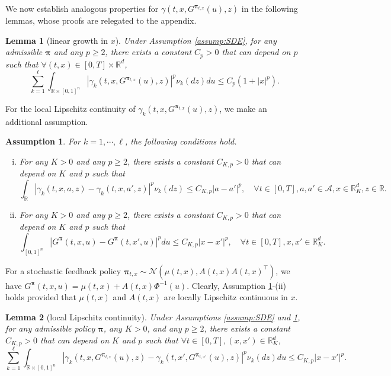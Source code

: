 \documentclass[11pt]{article}
\newtheorem{lemma}{Lemma}
\newtheorem{assumption}{Assumption}
\newcommand{\1}{\mathbbm{1}}
\newcommand{\bpi}{\boldsymbol{\pi}}
\begin{document}
We now establish analogous  properties for $\gamma(t,x,G^{\bpi_{t,x}}(u),z)$ in the following lemmas, whose proofs are relegated to the appendix.

\begin{lemma}[linear growth in $x$]\label{lem:expl-jump-LG}
Under Assumption \ref{assump:SDE}, for any admissible $\bpi$ and any $p\geq 2$, there exists a constant $C_p>0$ that can depend on $p$ such that $\forall(t, x) \in[0, T] \times \mathbb{R}^d$,
\begin{equation}
	\sum_{k=1}^\ell \int_{\mathbb{R}\times[0,1]^n}\left|\gamma_k\left(t,x,G^{\bpi_{t,x}}(u),z\right)\right|^p\nu_k(dz)du\leq C_p(1+|x|^p).
\end{equation}
\end{lemma}

For the local Lipschitz continuity of $\gamma_k(t,x,G^{\bpi_{t,x}}(u),z)$, we make an additional  assumption.
\begin{assumption}\label{assump:jump}
	For $k=1,\cdots,\ell$, the following conditions hold.
	\begin{enumerate}[(i)]
		\item For any $K>0$ and any $p\geq 2$, there exists a constant $C_{K,p}>0$ that can depend on $K$ and $p$ such that
		\begin{equation}
			\int_{\mathbb{R}}\left|\gamma_{k}(t,x,a,z)-\gamma_{k}(t,x,a',z)\right|^p\nu_k(dz)\leq C_{K,p}|a-a'|^p,\quad \forall t\in[0,T], a,a'\in\mathcal{A}, x\in \mathbb{R}^d_K, z\in\mathbb{R}.
		\end{equation}
		
		\item For any $K>0$ and any $p\geq 2$, there exists a constant $C_{K,p}>0$ that can depend on $K$ and $p$ such that
		\begin{equation}\label{eq:G-LC}
			\int_{[0,1]^n}\left|G^{\bpi}(t,x,u)-G^{\bpi}(t,x',u)\right|^pdu\le C_{K,p}|x-x'|^p,\quad \forall t\in[0,T], {x, x' \in \mathbb{R}^d_K.}
		\end{equation}
	\end{enumerate}
\end{assumption}

For a stochastic feedback policy $\bpi_{t,x}\sim\mathcal{N}(\mu(t,x), A(t,x)A(t,x)^\top)$, we have $G^{\bpi}(t,x,u)=\mu(t,x) + A(t,x)\Phi^{-1}(u)$. Clearly, Assumption \ref{assump:jump}-(ii) holds provided that $\mu(t,x)$ and $A(t,x)$ are locally Lipschitz continuous in $x$.

\begin{lemma}[local Lipschitz continuity]\label{lem:expl-jump-LC} Under Assumptions \ref{assump:SDE} and \ref{assump:jump}, for any admissible policy $\bpi$, any $K>0$, and any $p\geq 2$, there exists a constant $C_{K,p}>0$ that can depend on $K$ and $p$ such that $\forall t\in[0, T], (x,x')\in\mathbb{R}^d_K$,
	\begin{equation}
		\sum_{k=1}^\ell \int_{\mathbb{R}\times[0,1]^n}\left|\gamma_k\left(t,x,G^{\bpi_{t,x}}(u),z\right)-\gamma_k\left(t,x',G^{\bpi_{t,x'}}(u),z\right)\right|^p\nu_k(dz)du\le C_{K,p}|x-x'|^p.
	\end{equation}
\end{lemma}
\end{document}
